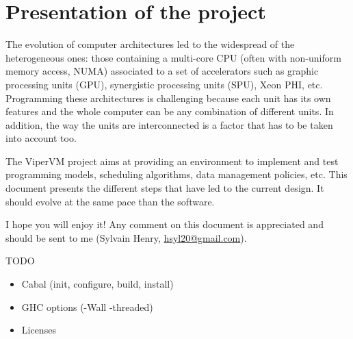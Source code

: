 \chapter{Presentation of the project}

The evolution of computer architectures led to the widespread of the
heterogeneous ones: those containing a multi-core CPU (often with non-uniform
memory access, NUMA) associated to a set of accelerators such as graphic
processing units (GPU), synergistic processing units (SPU), Xeon PHI, etc.
Programming these architectures is challenging because each unit has its own
features and the whole computer can be any combination of different units. In
addition, the way the units are interconnected is a factor that has to be taken
into account too.

The ViperVM project aims at providing an environment to implement and test
programming models, scheduling algorithms, data management policies, etc. This
document presents the different steps that have led to the current design. It
should evolve at the same pace than the software. 

I hope you will enjoy it! Any comment on this document is appreciated and should
be sent to me (Sylvain Henry, \url{hsyl20@gmail.com}).

\vfill
TODO
\begin{itemize}
   \item Cabal (init, configure, build, install)
   \item GHC options (-Wall -threaded)
   \item Licenses
\end{itemize}
